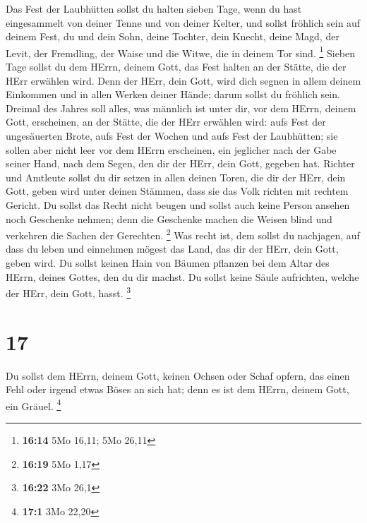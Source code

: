 Das Fest der Laubhütten sollst du halten sieben Tage, wenn
du hast eingesammelt von deiner Tenne und von deiner Kelter,
 und sollst fröhlich sein auf deinem Fest, du und dein
Sohn, deine Tochter, dein Knecht, deine Magd, der Levit, der Fremdling,
der Waise und die Witwe, die in deinem Tor sind. \footnote{\textbf{16:14}
  5Mo 16,11; 5Mo 26,11}  Sieben Tage sollst du dem HErrn,
deinem Gott, das Fest halten an der Stätte, die der HErr erwählen wird.
Denn der HErr, dein Gott, wird dich segnen in allem deinem Einkommen und
in allen Werken deiner Hände; darum sollst du fröhlich sein.
 Dreimal des Jahres soll alles, was männlich ist unter dir,
vor dem HErrn, deinem Gott, erscheinen, an der Stätte, die der HErr
erwählen wird: aufs Fest der ungesäuerten Brote, aufs Fest der Wochen
und aufs Fest der Laubhütten; sie sollen aber nicht leer vor dem HErrn
erscheinen,  ein jeglicher nach der Gabe seiner Hand, nach
dem Segen, den dir der HErr, dein Gott, gegeben hat. 
Richter und Amtleute sollst du dir setzen in allen deinen Toren, die dir
der HErr, dein Gott, geben wird unter deinen Stämmen, dass sie das Volk
richten mit rechtem Gericht.  Du sollst das Recht nicht
beugen und sollst auch keine Person ansehen noch Geschenke nehmen; denn
die Geschenke machen die Weisen blind und verkehren die Sachen der
Gerechten. \footnote{\textbf{16:19} 5Mo 1,17}  Was recht
ist, dem sollst du nachjagen, auf dass du leben und einnehmen mögest das
Land, das dir der HErr, dein Gott, geben wird.  Du sollst
keinen Hain von Bäumen pflanzen bei dem Altar des HErrn, deines Gottes,
den du dir machst.  Du sollst keine Säule aufrichten,
welche der HErr, dein Gott, hasst. \footnote{\textbf{16:22} 3Mo 26,1}

\hypertarget{section-2}{%
\section{17}\label{section-2}}

 Du sollst dem HErrn, deinem Gott, keinen Ochsen oder Schaf
opfern, das einen Fehl oder irgend etwas Böses an sich hat; denn es ist
dem HErrn, deinem Gott, ein Gräuel. \footnote{\textbf{17:1} 3Mo 22,20}

